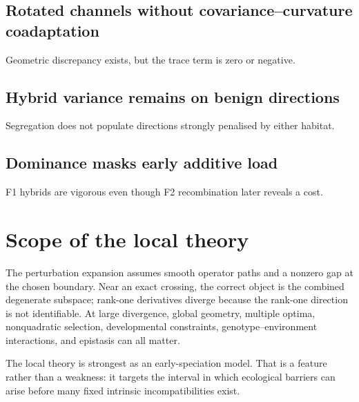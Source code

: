 \subsection{Rotated channels without covariance--curvature coadaptation}
Geometric discrepancy exists, but the trace term is zero or negative.

\subsection{Hybrid variance remains on benign directions}
Segregation does not populate directions strongly penalised by either habitat.

\subsection{Dominance masks early additive load}
F1 hybrids are vigorous even though F2 recombination later reveals a cost.

\section{Scope of the local theory}

The perturbation expansion assumes smooth operator paths and a nonzero gap at the chosen boundary. Near an exact crossing, the correct object is the combined degenerate subspace; rank-one derivatives diverge because the rank-one direction is not identifiable. At large divergence, global geometry, multiple optima, nonquadratic selection, developmental constraints, genotype--environment interactions, and epistasis can all matter.

\begin{summarybox}
The local theory is strongest as an early-speciation model. That is a feature rather than a weakness: it targets the interval in which ecological barriers can arise before many fixed intrinsic incompatibilities exist.
\end{summarybox}
